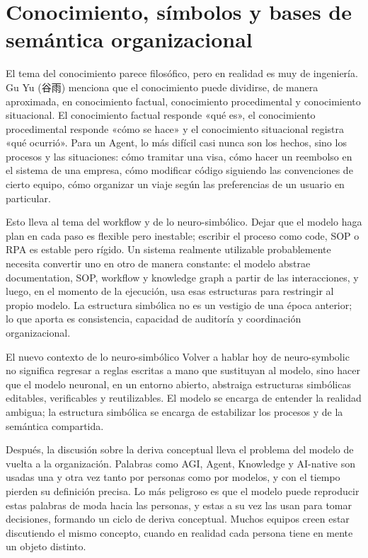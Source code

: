 \section{Conocimiento, símbolos y bases de semántica organizacional}

El tema del conocimiento parece filosófico, pero en realidad es muy de ingeniería. Gu Yu (谷雨) menciona que el conocimiento puede dividirse, de manera aproximada, en conocimiento factual, conocimiento procedimental y conocimiento situacional. El conocimiento factual responde «qué es», el conocimiento procedimental responde «cómo se hace» y el conocimiento situacional registra «qué ocurrió». Para un Agent, lo más difícil casi nunca son los hechos, sino los procesos y las situaciones: cómo tramitar una visa, cómo hacer un reembolso en el sistema de una empresa, cómo modificar código siguiendo las convenciones de cierto equipo, cómo organizar un viaje según las preferencias de un usuario en particular.

Esto lleva al tema del workflow y de lo neuro-simbólico. Dejar que el modelo haga plan en cada paso es flexible pero inestable; escribir el proceso como code, SOP o RPA es estable pero rígido. Un sistema realmente utilizable probablemente necesita convertir uno en otro de manera constante: el modelo abstrae documentation, SOP, workflow y knowledge graph a partir de las interacciones, y luego, en el momento de la ejecución, usa esas estructuras para restringir al propio modelo. La estructura simbólica no es un vestigio de una época anterior; lo que aporta es consistencia, capacidad de auditoría y coordinación organizacional.

\begin{importantbox}{El nuevo contexto de lo neuro-simbólico}
Volver a hablar hoy de neuro-symbolic no significa regresar a reglas escritas a mano que sustituyan al modelo, sino hacer que el modelo neuronal, en un entorno abierto, abstraiga estructuras simbólicas editables, verificables y reutilizables. El modelo se encarga de entender la realidad ambigua; la estructura simbólica se encarga de estabilizar los procesos y de la semántica compartida.
\end{importantbox}

Después, la discusión sobre la deriva conceptual lleva el problema del modelo de vuelta a la organización. Palabras como AGI, Agent, Knowledge y AI-native son usadas una y otra vez tanto por personas como por modelos, y con el tiempo pierden su definición precisa. Lo más peligroso es que el modelo puede reproducir estas palabras de moda hacia las personas, y estas a su vez las usan para tomar decisiones, formando un ciclo de deriva conceptual. Muchos equipos creen estar discutiendo el mismo concepto, cuando en realidad cada persona tiene en mente un objeto distinto.

